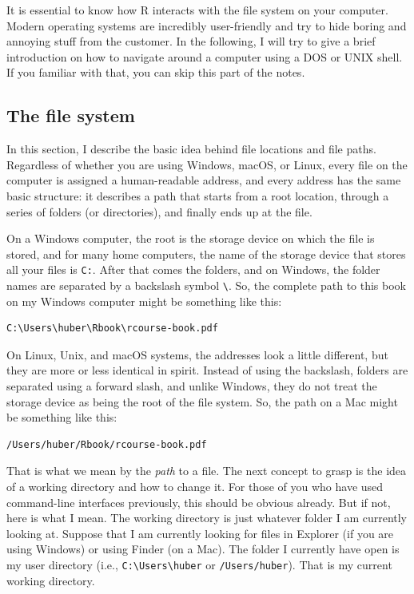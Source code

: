 \documentclass[
  12pt,
  oneside]{book}
\begin{document}
It is essential to know how R interacts with the file system on your computer. Modern operating systems are incredibly user-friendly and try to hide boring and annoying stuff from the customer. In the following, I will try to give a brief introduction on how to navigate around a computer using a DOS or UNIX shell. If you familiar with that, you can skip this part of the notes.

\hypertarget{sec:filesystem}{%
\subsection{The file system}\label{sec:filesystem}}

In this section, I describe the basic idea behind file locations and file paths. Regardless of whether you are using Windows, macOS, or Linux, every file on the computer is assigned a human-readable address, and every address has the same basic structure: it describes a path that starts from a root location, through a series of folders (or directories), and finally ends up at the file.

On a Windows computer, the root is the storage device on which the file is stored, and for many home computers, the name of the storage device that stores all your files is \texttt{C:}. After that comes the folders, and on Windows, the folder names are separated by a backslash symbol \texttt{\textbackslash{}}. So, the complete path to this book on my Windows computer might be something like this:

\begin{verbatim}
C:\Users\huber\Rbook\rcourse-book.pdf
\end{verbatim}

On Linux, Unix, and macOS systems, the addresses look a little different, but they are more or less identical in spirit. Instead of using the backslash, folders are separated using a forward slash, and unlike Windows, they do not treat the storage device as being the root of the file system. So, the path on a Mac might be something like this:

\begin{verbatim}
/Users/huber/Rbook/rcourse-book.pdf
\end{verbatim}

That is what we mean by the \emph{path} to a file. The next concept to grasp is the idea of a working directory and how to change it. For those of you who have used command-line interfaces previously, this should be obvious already. But if not, here is what I mean. The working directory is just whatever folder I am currently looking at. Suppose that I am currently looking for files in Explorer (if you are using Windows) or using Finder (on a Mac). The folder I currently have open is my user directory (i.e., \texttt{C:\textbackslash{}Users\textbackslash{}huber} or \texttt{/Users/huber}). That is my current working directory.
\end{document}
